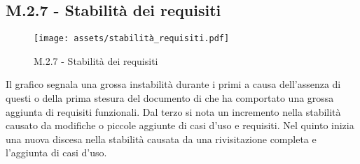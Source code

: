 \subsection{M.2.7 - Stabilità dei requisiti}
\begin{figure}[H]
    \centering
    \texttt{[image: assets/stabilità\_requisiti.pdf]}
    \caption{M.2.7 - Stabilità dei requisiti}
\end{figure}

\par Il grafico segnala una grossa instabilità durante i primi  a causa dell'assenza di questi o della prima stesura del documento di \AdR che ha comportato una grossa aggiunta di requisiti funzionali. Dal terzo  si nota un incremento nella stabilità causato da modifiche o piccole aggiunte di casi d'uso e requisiti. Nel quinto  inizia una nuova discesa nella stabilità causata da una rivisitazione completa e l'aggiunta di casi d'uso.